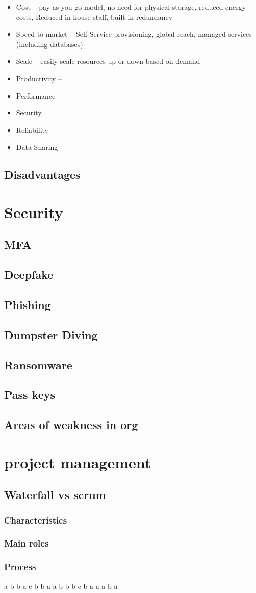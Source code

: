 \documentclass{report}
\begin{document}
\begin{itemize}
    \item Cost -- pay as you go model, no need for physical storage, reduced energy costs, Reduced in house staff, built in redundancy
    \item Speed to market  -- Self Service provisioning, global reach, managed services (including databases)
    \item Scale -- easily scale resources up or down based on demand
    \item Productivity -- 
    \item Performance
    \item Security
    \item Reliability
    \item Data Sharing

\end{itemize}

\subsection{Disadvantages}

\section{Security}
\subsection{MFA}
\subsection{Deepfake}
\subsection{Phishing}
\subsection{Dumpster Diving}
\subsection{Ransomware}
\subsection{Pass keys}
\subsection{Areas of weakness in org}
\section{project management}
\subsection{Waterfall vs scrum}
\subsubsection{Characteristics}
\subsubsection{Main roles}
\subsubsection{Process}


a
b
b
a
e
b
b
a
a
b
b
b
c
b
a
a
a
b
a
\end{document}
